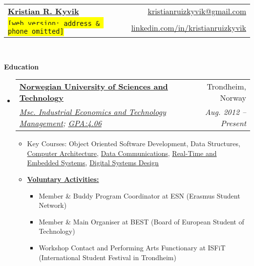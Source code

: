 \documentclass[letterpaper,11pt]{article}
\makeatletter
\newcommand{\resitem}[1]{\item #1 \vspace{-2pt}}
\newcommand{\resheading}[1]{{\large \colorbox{mygrey}{\begin{minipage}{\textwidth}{\textbf{#1 \vphantom{p\^{E}}}}\end{minipage}}}}
\newcommand{\ressubheading}[4]{
\begin{tabular*}{6.5in}{l@{\extracolsep{\fill}}r}
        \textbf{#1} & #2 \\
        \textit{#3} & \textit{#4} \\
\end{tabular*}\vspace{-6pt}}
\makeatother
\begin{document}
\newcommand{\mywebheader}{
\begin{tabular*}{7in}{l@{\extracolsep{\fill}}r}
    \textbf{\href{http://www.derekhildreth.com/}{\LARGE Kristian R. Kyvik}} & \href{mailto:kristianruizkyvik@gmail.com}{kristianruizkyvik@gmail.com}\\
    {\footnotesize \texttt{\colorbox{yellow}{[web version:  address \& phone omitted]}}} & \href{http://www.linkedin.com/in/kristianruizkyvik}{linkedin.com/in/kristianruizkyvik} \\
    \end{tabular*}
\\
\vspace{0.1in}}

\mywebheader

\resheading{Education}
    \begin{itemize}
        \item
            \ressubheading{\href{http://www.byui.edu}{Norwegian University of Sciences and Technology}}{Trondheim, Norway}{\href{http://www.byui.edu/csee/compe/default.htm}{Msc. Industrial Economics and Technology Management}; \href{http://www.ntnu.com/portfolio/unofficial_transcript.pdf}{GPA:4.06}}{Aug. 2012 -- Present}
                { \footnotesize
                \begin{itemize}
                    \resitem{Key Courses: Object Oriented Software Development, Data Structures, \href{http://derekhildreth.com/portfolio/Resume/catalog/class.asp1045.htm}{Computer Architecture}, \href{http://derekhildreth.com/portfolio/Resume/catalog/class.asp1073.htm}{Data Communications}, \href{http://derekhildreth.com/portfolio/Resume/catalog/class.asp1072.htm}{Real-Time and Embedded Systems}, \href{http://derekhildreth.com/portfolio/Resume/catalog/class.asp1069.htm}{Digital Systems Design}}
                    \resitem{\textbf{\href{http://www.byui.edu/Societies/Linux/}{ Voluntary Activities:}}}
                        \begin{itemize}
                            \resitem{ Member \& Buddy Program Coordinator at ESN (Erasmus Student Network)}
                            \resitem{ Member \& Main Organiser at BEST (Board of European Student of Technology)}
                            \resitem{ Workshop Contact and Performing Arts Functionary at ISFiT (International Student Festival in Trondheim)}
                        \end{itemize}

\end{itemize}}
\end{itemize}
\end{document}
